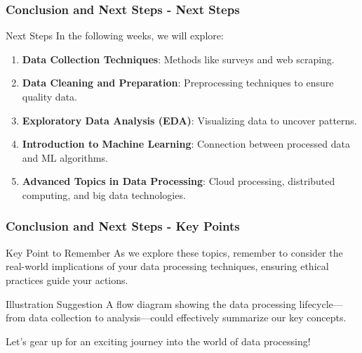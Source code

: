 \documentclass[aspectratio=169]{beamer}
\begin{document}
\begin{frame}[fragile]
    \frametitle{Conclusion and Next Steps - Next Steps}
    \begin{block}{Next Steps}
        In the following weeks, we will explore:
    \end{block}
    \begin{enumerate}
        \item \textbf{Data Collection Techniques}: Methods like surveys and web scraping.
        \item \textbf{Data Cleaning and Preparation}: Preprocessing techniques to ensure quality data.
        \item \textbf{Exploratory Data Analysis (EDA)}: Visualizing data to uncover patterns.
        \item \textbf{Introduction to Machine Learning}: Connection between processed data and ML algorithms.
        \item \textbf{Advanced Topics in Data Processing}: Cloud processing, distributed computing, and big data technologies.
    \end{enumerate}
\end{frame}

\begin{frame}[fragile]
    \frametitle{Conclusion and Next Steps - Key Points}
    \begin{block}{Key Point to Remember}
        As we explore these topics, remember to consider the real-world implications of your data processing techniques, ensuring ethical practices guide your actions.
    \end{block}
    \begin{block}{Illustration Suggestion}
        A flow diagram showing the data processing lifecycle—from data collection to analysis—could effectively summarize our key concepts.
    \end{block}
    Let’s gear up for an exciting journey into the world of data processing!
\end{frame}
\end{document}
